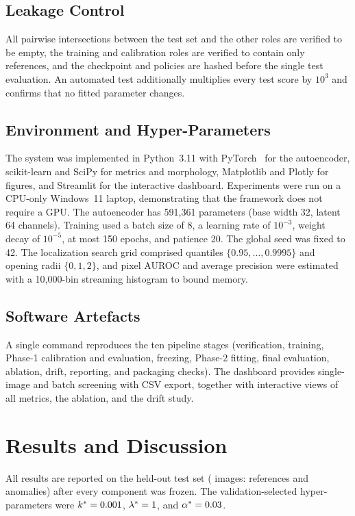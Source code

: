 \documentclass[conference]{IEEEtran}
\begin{document}
\subsection{Leakage Control}
All pairwise intersections between the test set and the other roles are verified to be empty, the training and calibration roles are verified to contain only references, and the checkpoint and policies are hashed before the single test evaluation. An automated test additionally multiplies every test score by $10^3$ and confirms that no fitted parameter changes.

\subsection{Environment and Hyper-Parameters}
The system was implemented in Python~3.11 with PyTorch~\cite{paszke2019} for the autoencoder, scikit-learn and SciPy for metrics and morphology, Matplotlib and Plotly for figures, and Streamlit for the interactive dashboard. Experiments were run on a CPU-only Windows~11 laptop, demonstrating that the framework does not require a GPU. The autoencoder has 591{,}361 parameters (base width 32, latent 64 channels). Training used a batch size of 8, a learning rate of $10^{-3}$, weight decay of $10^{-5}$, at most 150 epochs, and patience 20. The global seed was fixed to 42. The localization search grid comprised quantiles $\{0.95,\dots,0.9995\}$ and opening radii $\{0,1,2\}$, and pixel AUROC and average precision were estimated with a 10{,}000-bin streaming histogram to bound memory.

\subsection{Software Artefacts}
A single command reproduces the ten pipeline stages (verification, training, Phase-1 calibration and evaluation, freezing, Phase-2 fitting, final evaluation, ablation, drift, reporting, and packaging checks). The dashboard provides single-image and batch screening with CSV export, together with interactive views of all metrics, the ablation, and the drift study.

\section{Results and Discussion}
All results are reported on the held-out test set (\NTest{} images: \NTestRef{} references and \NTestAnom{} anomalies) after every component was frozen. The validation-selected hyper-parameters were $k^*=0.001{}$, $\lambda^*=1{}$, and $\alpha^*=0.03{}$.
\end{document}
